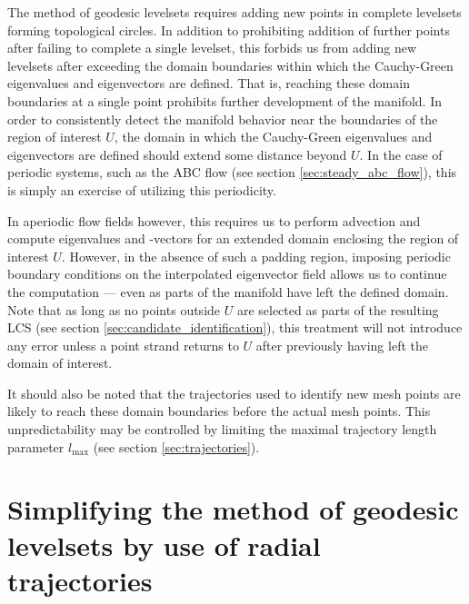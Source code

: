 The method of geodesic levelsets requires adding new points in complete levelsets forming topological circles. In addition to prohibiting addition of further points after failing to complete a single levelset, this forbids us from adding new levelsets after exceeding the domain boundaries within which the Cauchy-Green eigenvalues and eigenvectors are defined. That is, reaching these domain boundaries at a single point prohibits further development of the manifold. In order to consistently detect the manifold behavior near the boundaries of the region of interest $U$, the domain in which the Cauchy-Green eigenvalues and eigenvectors are defined should extend some distance beyond $U$. In the case of periodic systems, such as the ABC flow (see section \ref{sec:steady_abc_flow}), this is simply an exercise of utilizing this periodicity. 

In aperiodic flow fields however, this requires us to perform advection and compute eigenvalues and -vectors for an extended domain enclosing the region of interest $U$. However, in the absence of such a padding region, imposing periodic boundary conditions on the interpolated eigenvector field allows us to continue the computation --- even as parts of the manifold have left the defined domain. Note that as long as no points outside $U$ are selected as parts of the resulting LCS (see section \ref{sec:candidate_identification}), this treatment will not introduce any error unless a point strand returns to $U$ after previously having left the domain of interest. 

It should also be noted that the trajectories used to identify new mesh points are likely to reach these domain boundaries before the actual mesh points. This unpredictability may be controlled by limiting the maximal trajectory length parameter $l_{\text{max}}$ (see section \ref{sec:trajectories}).

\section{Simplifying the method of geodesic levelsets by use of radial trajectories}\label{sec:force_radially_outward}

